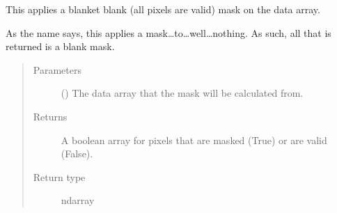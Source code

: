 \documentclass[letterpaper,10pt,english]{sphinxmanual}
\begin{document}
\begin{fulllineitems}
\label{\detokenize{docstrings/ifa_smeargle.masking.geometric:ifa_smeargle.masking.geometric.mask_nothing}}
This applies a blanket blank (all pixels are valid) mask on
the data array.

As the name says, this applies a mask…to…well…nothing. As
such, all that is returned is a blank mask.
\begin{quote}\begin{description}
\item[{Parameters}] \leavevmode
{} () \textendash{} The data array that the mask will be calculated from.

\item[{Returns}] \leavevmode
{} \textendash{} A boolean array for pixels that are masked (True) or are
valid (False).

\item[{Return type}] \leavevmode
ndarray

\end{description}\end{quote}

\end{fulllineitems}

\end{document}
